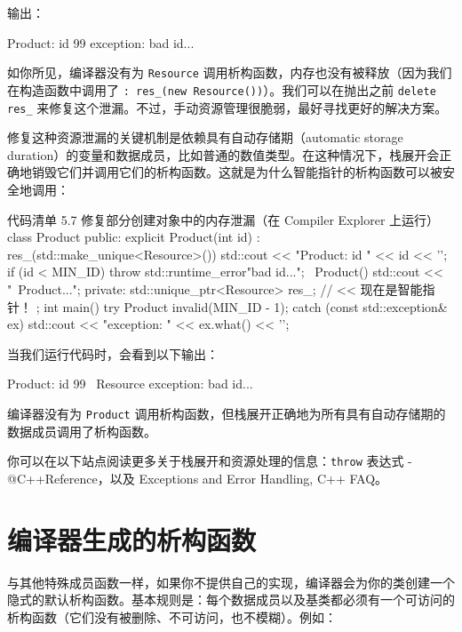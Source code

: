 输出：

\begin{codebox}[cpp]
Product: id 99
exception: bad id...
\end{codebox}

如你所见，编译器没有为 \texttt{Resource} 调用析构函数，内存也没有被释放（因为我们在构造函数中调用了 \texttt{: res\_(new Resource())}）。我们可以在抛出之前 \texttt{delete res\_} 来修复这个泄漏。不过，手动资源管理很脆弱，最好寻找更好的解决方案。

修复这种资源泄漏的关键机制是依赖具有自动存储期（automatic storage duration）的变量和数据成员，比如普通的数值类型。在这种情况下，栈展开会正确地销毁它们并调用它们的析构函数。这就是为什么智能指针的析构函数可以被安全地调用：

\begin{codeboxt}[cpp]{代码清单 5.7 修复部分创建对象中的内存泄漏（在 Compiler Explorer 上运行）}
class Product {
public:
explicit Product(int id) : res_(std::make_unique<Resource>()) {
std::cout << "Product: id " << id << '\n';
if (id < MIN_ID)
throw std::runtime_error{"bad id..."};
}
~Product() {
std::cout <<
"~Product...\n";
}
private:
std::unique_ptr<Resource> res_; // << 现在是智能指针！
};
int main() {
try {
Product invalid(MIN_ID - 1);
}
catch (const std::exception& ex) {
std::cout << "exception: " << ex.what() << '\n';
}
}
\end{codeboxt}

当我们运行代码时，会看到以下输出：

\begin{codebox}[cpp]
Product: id 99
~Resource
exception: bad id...
\end{codebox}

编译器没有为 \texttt{Product} 调用析构函数，但栈展开正确地为所有具有自动存储期的数据成员调用了析构函数。

\begin{myInfoBox}
你可以在以下站点阅读更多关于栈展开和资源处理的信息：\texttt{throw} 表达式 - @C++Reference，以及 Exceptions and Error Handling, C++ FAQ。
\end{myInfoBox}


\section{编译器生成的析构函数}

与其他特殊成员函数一样，如果你不提供自己的实现，编译器会为你的类创建一个隐式的默认析构函数。基本规则是：每个数据成员以及基类都必须有一个可访问的析构函数（它们没有被删除、不可访问，也不模糊）。例如：

